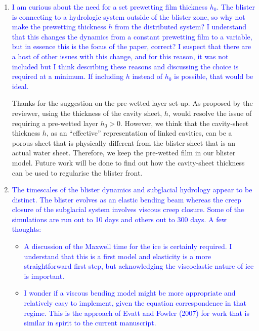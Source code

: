 \documentclass[11pt]{article}
\begin{document}
\begin{enumerate}
\item \textcolor{blue}{I am curious about the need for a set prewetting film thickness $h_0$. The blister is
connecting to a hydrologic system outside of the blister zone, so why not make the
prewetting thickness $h$ from the distributed system? I understand that this changes
the dynamics from a constant prewetting film to a variable, but in essence this is
the focus of the paper, correct? I suspect that there are a host of other issues with
this change, and for this reason, it was not included but I think describing these
reasons and discussing the choice is required at a minimum. If including $h$
instead of $h_0$ is possible, that would be ideal.}

Thanks for the suggestion on the pre-wetted layer set-up. As proposed by the reviewer, using the thickness of the cavity sheet, $h$, would resolve the issue of requiring a pre-wetted layer $h_0>0$. However, we think that the cavity-sheet thickness $h$, as an ``effective'' representation of linked cavities, can be a porous sheet that is physically different from the blister sheet that is an actual water sheet. Therefore, we keep the pre-wetted film in our blister model. Future work will be done to find out how the cavity-sheet thickness can be used to regularise the blister front.

\item \textcolor{blue}{The timescales of the blister dynamics and subglacial hydrology appear to be distinct.
The blister evolves as an elastic bending beam whereas the creep closure of
the subglacial system involves viscous creep closure. Some of the simulations are
run out to 10 days and others out to 300 days. A few thoughts:}

\begin{itemize}
\item \textcolor{blue}{A discussion of the Maxwell time for the ice is certainly required. I understand
that this is a first model and elasticity is a more straightforward first step, but
acknowledging the viscoelastic nature of ice is important.}

\item \textcolor{blue}{I wonder if a viscous bending model might be more appropriate and relatively
easy to implement, given the equation correspondence in that regime. This is
the approach of Evatt and Fowler (2007) for work that is similar in spirit to
the current manuscript.}
\end{itemize}


\end{enumerate}
\end{document}
